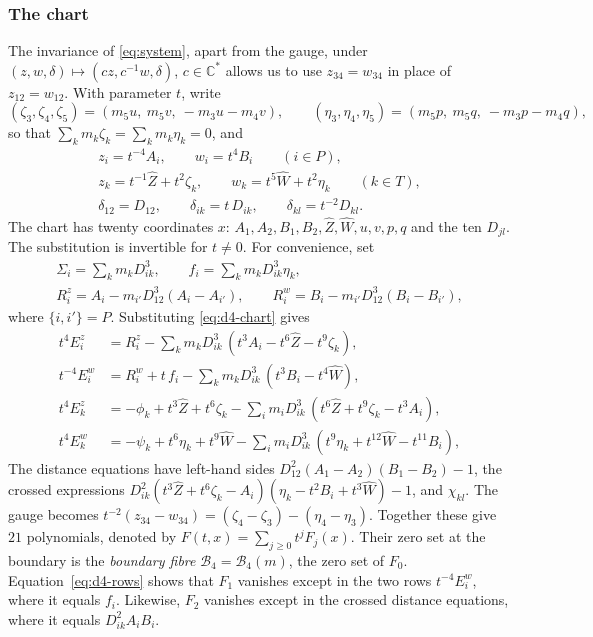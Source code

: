 \documentclass[Threeside,11pt]{article}
\theoremstyle{definition}
\theoremstyle{remark}
\numberwithin{equation}{section}
\newcommand{\C}{\mathbb C}\newcommand{\T}{\mathbb T}
\theoremstyle{remark}
\begin{document}
\subsubsection{The chart}\label{d4-chart}
{The invariance of \eqref{eq:system}, apart from the gauge, under
$(z,w,\delta)\mapsto(cz,c^{-1}w,\delta)$, $c\in\C^*$ allows us to use
$z_{34}=w_{34}$ in place of $z_{12}=w_{12}$. With parameter $t$, write}
\[
  (\zeta_3,\zeta_4,\zeta_5)=(m_5u,\ m_5v,\ -m_3u-m_4v),\qquad
  (\eta_3,\eta_4,\eta_5)=(m_5p,\ m_5q,\ -m_3p-m_4q),
\]
so that $\sum_km_k\zeta_k=\sum_km_k\eta_k=0$, and
\begin{equation}\label{eq:d4-chart}
\begin{gathered}
  z_i=t^{-4}A_i,\qquad w_i=t^{4}B_i\qquad(i\in P),\\
  z_k=t^{-1}\hat Z+t^{2}\zeta_k,\qquad w_k=t^{5}\hat W+t^{2}\eta_k\qquad(k\in T),\\
  \delta_{12}=D_{12},\qquad\delta_{ik}=t\,D_{ik},\qquad\delta_{kl}=t^{-2}D_{kl}.
\end{gathered}
\end{equation}
{The chart has twenty coordinates $x$: $A_1,A_2,B_1,B_2,\hat Z,\hat W,u,v,p,q$
and the ten $D_{jl}$. The substitution is invertible for $t\ne0$.
For convenience, set}
\[
\begin{gathered}
  \Sigma_i=\sum_km_kD_{ik}^3,\qquad f_i=\sum_km_kD_{ik}^3\eta_k,\\
  R^z_i=A_i-m_{i'}D_{12}^3(A_i-A_{i'}),\qquad R^w_i=B_i-m_{i'}D_{12}^3(B_i-B_{i'}),
\end{gathered}
\]
where $\{i,i'\}=P$.  Substituting \eqref{eq:d4-chart} gives
\begin{equation}\label{eq:d4-rows}
\begin{aligned}
  t^{4}E^z_i&=R^z_i-\textstyle\sum_km_kD_{ik}^3\,(t^3A_i-t^6\hat Z-t^9\zeta_k),\\
  t^{-4}E^w_i&=R^w_i+t\,f_i-\textstyle\sum_km_kD_{ik}^3\,(t^3B_i-t^4\hat W),\\
  t^{4}E^z_k&=-\phi_k+t^3\hat Z+t^6\zeta_k-\textstyle\sum_im_iD_{ik}^3\,(t^6\hat Z+t^9\zeta_k-t^3A_i),\\
  t^{4}E^w_k&=-\psi_k+t^6\eta_k+t^9\hat W-\textstyle\sum_im_iD_{ik}^3\,(t^9\eta_k+t^{12}\hat W
  -t^{11}B_i),
\end{aligned}
\end{equation}
{The distance equations have left-hand sides
$D_{12}^2(A_1-A_2)(B_1-B_2)-1$, the crossed expressions
$D_{ik}^2(t^3\hat Z+t^6\zeta_k-A_i)(\eta_k-t^2B_i+t^3\hat W)-1$, and $\chi_{kl}$.
The gauge becomes $t^{-2}(z_{34}-w_{34})=(\zeta_4-\zeta_3)-(\eta_4-\eta_3)$.
Together these give $21$ polynomials, denoted by $F(t,x)=\sum_{j\ge0}t^jF_j(x)$.
Their zero set at the boundary is the \emph{boundary fibre} $\mathcal B_4=\mathcal B_4(m)$,
the zero set of $F_0$. Equation~\eqref{eq:d4-rows} shows that $F_1$ vanishes except in the two
rows $t^{-4}E^w_i$, where it equals $f_i$. Likewise, $F_2$ vanishes except in the crossed
distance equations, where it equals $D_{ik}^2A_iB_i$.}
\end{document}
